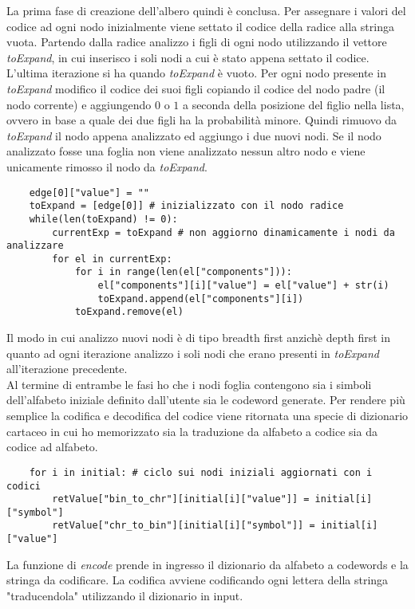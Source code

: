 \documentclass{article}
\begin{document}
La prima fase di creazione dell'albero quindi è conclusa. Per assegnare i valori del codice ad ogni nodo inizialmente viene settato il codice della radice alla stringa vuota. Partendo dalla radice analizzo i figli di ogni nodo utilizzando il vettore \textit{toExpand}, in cui inserisco i soli nodi a cui è stato appena settato il codice. L'ultima iterazione si ha quando \textit{toExpand} è vuoto.
Per ogni nodo presente in \textit{toExpand} modifico il codice dei suoi figli copiando il codice del nodo padre (il nodo corrente) e aggiungendo $0$ o $1$ a seconda della posizione del figlio nella lista, ovvero in base a quale dei due figli ha la probabilità minore. Quindi rimuovo da \textit{toExpand} il nodo appena analizzato ed aggiungo i due nuovi nodi. Se il nodo analizzato fosse una foglia non viene analizzato nessun altro nodo e viene unicamente rimosso il nodo da \textit{toExpand}.\\
\begin{lstlisting}
    edge[0]["value"] = ""
    toExpand = [edge[0]] # inizializzato con il nodo radice
    while(len(toExpand) != 0):
        currentExp = toExpand # non aggiorno dinamicamente i nodi da analizzare
        for el in currentExp:
            for i in range(len(el["components"])):
                el["components"][i]["value"] = el["value"] + str(i)
                toExpand.append(el["components"][i])
            toExpand.remove(el)
\end{lstlisting}
Il modo in cui analizzo nuovi nodi è di tipo breadth first anzichè depth first in quanto ad ogni iterazione analizzo i soli nodi che erano presenti in \textit{toExpand} all'iterazione precedente. \\
Al termine di entrambe le fasi ho che i nodi foglia contengono sia i simboli dell'alfabeto iniziale definito dall'utente sia le codeword generate. Per rendere più semplice la codifica e decodifica del codice viene ritornata una specie di dizionario cartaceo in cui ho memorizzato sia la traduzione da alfabeto a codice sia da codice ad alfabeto.
\begin{lstlisting}
    for i in initial: # ciclo sui nodi iniziali aggiornati con i codici
        retValue["bin_to_chr"][initial[i]["value"]] = initial[i]["symbol"]
        retValue["chr_to_bin"][initial[i]["symbol"]] = initial[i]["value"]
\end{lstlisting}    
La funzione di \textit{encode} prende in ingresso il dizionario da alfabeto a codewords e la stringa da codificare. La codifica avviene codificando ogni lettera della stringa "traducendola" utilizzando il dizionario in input.
\end{document}
